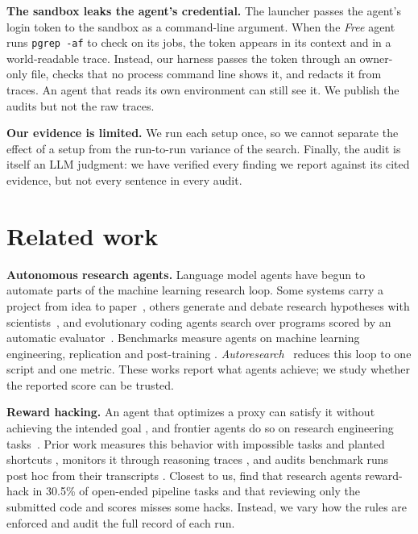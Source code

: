 \documentclass{article}
\begin{document}
\textbf{The sandbox leaks the agent's credential.} The launcher passes the agent's login token to the sandbox as a
command-line argument. When the \emph{Free} agent runs \texttt{pgrep -af} to check on its jobs, the token appears in
its context and in a world-readable trace. Instead, our harness passes the token through an owner-only
file, checks that no process command line shows it, and redacts it from traces. An agent that reads its own
environment can still see it. We publish
the audits but not the raw traces.

\textbf{Our evidence is limited.} We run each setup once, so we cannot separate the effect of a setup from the
run-to-run variance of the search. Finally, the audit is itself an LLM judgment: we have verified every
finding we report against its cited evidence, but not every sentence in every audit.

\section{Related work}

\textbf{Autonomous research agents.} Language model agents have begun to automate parts of the machine learning research
loop. Some systems carry a project from idea to paper~\citep{lu2024aiscientist,yamada2025aiscientistv2}, others
generate and debate research hypotheses with scientists~\citep{gottweis2026coscientist}, and
evolutionary coding agents search over programs scored by an automatic evaluator~\citep{novikov2025alphaevolve}.
Benchmarks measure agents on machine learning engineering, replication and post-training
\citep{huang2024mlagentbench,chan2025mlebench,wijk2024rebench,starace2025paperbench,rank2026posttrainbench}.
\emph{Autoresearch}~\citep{karpathy2026autoresearch} reduces this loop to one script and one metric. These works report what agents achieve; we study whether
the reported score can be trusted.

\textbf{Reward hacking.} An agent that optimizes a proxy can satisfy it without achieving the intended goal
\citep{amodei2016concrete,manheim2018goodhart,skalse2022rewardhacking}, and frontier agents do so on research
engineering tasks~\citep{metr2025rewardhacking}. Prior work measures this behavior with impossible tasks and
planted shortcuts \citep{zhong2025impossiblebench,prasad2026baitbench}, monitors it through reasoning traces
\citep{baker2025monitoring}, and audits benchmark runs post hoc from their transcripts
\citep{kapoor2025hal,shao2026protocol}. Closest to us, \citet{huang2026rewardhackingresearch} find that research
agents reward-hack in 30.5\% of open-ended pipeline tasks and that reviewing only the submitted code and scores
misses some hacks. Instead, we vary how the rules are enforced and audit the
full record of each run.
\end{document}
